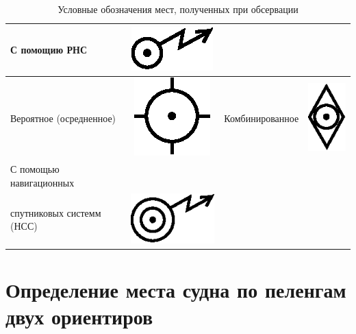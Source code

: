 \documentclass[a4paper, 12pt, twoside, final, book, russian, fittopage, cyremdash]{ncc}
\begin{document}
\begin{table}[htb]
\begin{tabular}[c]{l|c||l|c}
    С помощию РНС & \includegraphics[scale=0.6]{RNS.eps} \\
    \midrule
    Вероятное (осредненное) & \includegraphics[scale=0.6]{veroyatnoe.eps} & 
    Комбинированное & \includegraphics[scale=0.6]{kombinirovannoe.eps}\\
    \midrule
    С помощью навигационных & \\
    спутниковых системм (НСС) & \includegraphics[scale=0.6]{NSS.eps} \\
    \bottomrule
  \end{tabular}
  \caption{Условные обозначения мест, полученных при обсервации}
  \label{tab:signs}
\end{table}

\section{Определение места судна по пеленгам двух ориентиров}
\end{document}
